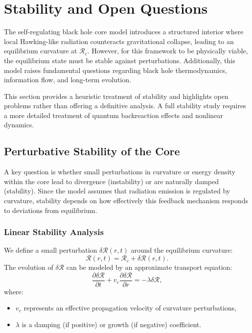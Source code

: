 \section{Stability and Open Questions}
\label{sec:stability}

The self-regulating black hole core model introduces a structured interior where local Hawking-like radiation counteracts gravitational collapse, leading to an equilibrium curvature at \( \mathcal{R}_c \). However, for this framework to be physically viable, the equilibrium state must be stable against perturbations. Additionally, this model raises fundamental questions regarding black hole thermodynamics, information flow, and long-term evolution.

This section provides a heuristic treatment of stability and highlights open problems rather than offering a definitive analysis. A full stability study requires a more detailed treatment of quantum backreaction effects and nonlinear dynamics.

\subsection{Perturbative Stability of the Core}

A key question is whether small perturbations in curvature or energy density within the core lead to divergence (instability) or are naturally damped (stability). Since the model assumes that radiation emission is regulated by curvature, stability depends on how effectively this feedback mechanism responds to deviations from equilibrium.

\subsubsection{Linear Stability Analysis}
We define a small perturbation \( \delta \mathcal{R}(r,t) \) around the equilibrium curvature:
\begin{equation}
    \mathcal{R}(r,t) = \mathcal{R}_c + \delta \mathcal{R}(r,t).
\end{equation}
The evolution of \( \delta \mathcal{R} \) can be modeled by an approximate transport equation:
\begin{equation}
    \frac{\partial \delta \mathcal{R}}{\partial t} + v_r \frac{\partial \delta \mathcal{R}}{\partial r} = -\lambda \delta \mathcal{R},
\end{equation}
where:
\begin{itemize}
    \item \( v_r \) represents an effective propagation velocity of curvature perturbations,
    \item \( \lambda \) is a damping (if positive) or growth (if negative) coefficient.
\end{itemize}

